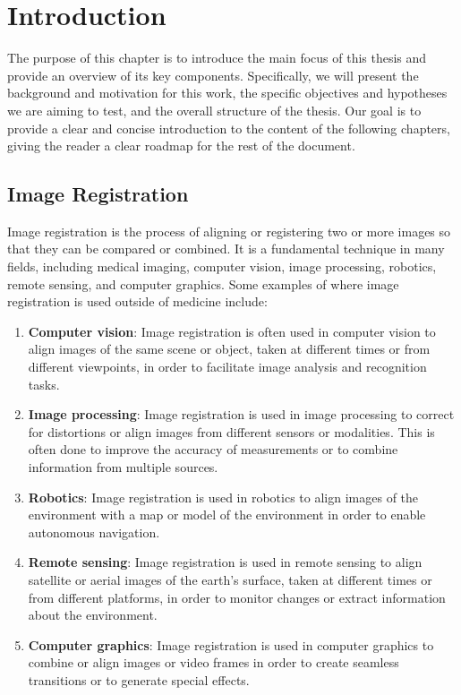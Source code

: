 \documentclass{book}
\begin{document}
	\hypersetup{linkcolor=rwth-blue-1}
	\tableofcontents	

	\newpage
	
	\chapter{Introduction} \label{chap:intro}
	The purpose of this chapter is to introduce the main focus of this thesis and provide an overview of its key components. Specifically, we will present the background and motivation for this work, the specific objectives and hypotheses we are aiming to test, and the overall structure of the thesis. Our goal is to provide a clear and concise introduction to the content of the following chapters, giving the reader a clear roadmap for the rest of the document.
	
	\section{Image Registration}
	Image registration is the process of aligning or registering two or more images so that they can be compared or combined. It is a fundamental technique in many fields, including medical imaging, computer vision, image processing, robotics, remote sensing, and computer graphics. Some examples of where image registration is used outside of medicine include:
	\begin{enumerate}
		\item \textbf{Computer vision}: Image registration is often used in computer vision to align images of the same scene or object, taken at different times or from different viewpoints, in order to facilitate image analysis and recognition tasks.
		\item \textbf{Image processing}: Image registration is used in image processing to correct for distortions or align images from different sensors or modalities. This is often done to improve the accuracy of measurements or to combine information from multiple sources.
		\item \textbf{Robotics}: Image registration is used in robotics to align images of the environment with a map or model of the environment in order to enable autonomous navigation.
		\item \textbf{Remote sensing}: Image registration is used in remote sensing to align satellite or aerial images of the earth's surface, taken at different times or from different platforms, in order to monitor changes or extract information about the environment.
		\item \textbf{Computer graphics}: Image registration is used in computer graphics to combine or align images or video frames in order to create seamless transitions or to generate special effects.
	\end{enumerate}
	
\end{document}
